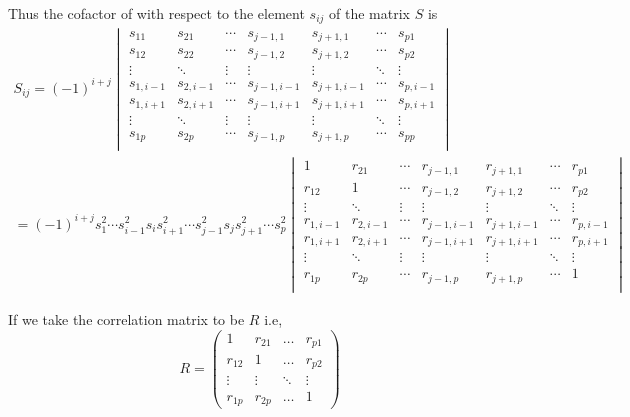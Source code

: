\documentclass[10pt]{article}
\begin{document}
Thus the cofactor of with respect to the element $ s_{ij} $ of the matrix $ S $ is 
\begin{gather}
	S_{ij} = (-1)^{i+j}
\begin{vmatrix}
	s_{11} & s_{21} & \cdots & s_{j-1,1} & s_{j+1, 1} & \cdots & s_{p1} \\
	s_{12} & s_{22} & \cdots & s_{j-1,2} & s_{j+1, 2} & \cdots & s_{p2} \\
	\vdots & \ddots & \vdots & \vdots & \vdots & \ddots & \vdots \\
	s_{1,i-1} & s_{2,i-1} & \cdots & s_{j-1,i-1} & s_{j+1,i-1} & \cdots & s_{p,i-1} \\
	s_{1,i+1} & s_{2,i+1} & \cdots & s_{j-1,i+1} & s_{j+1,i+1} & \cdots & s_{p,i+1} \\
	\vdots & \ddots & \vdots & \vdots & \vdots & \ddots & \vdots \\
	s_{1p} & s_{2p} & \cdots & s_{j-1,p} & s_{j+1, p} & \cdots & s_{pp} \\
\end{vmatrix} \nonumber \\
       = (-1)^{i+j} s_{1}^{2} \cdots s_{i-1}^{2}s_{i}s_{i+1}^{2} \cdots s_{j-1}^{2}s_{j}s_{j+1}^{2} \cdots s_{p}^{2}
\begin{vmatrix}
	1 & r_{21} & \cdots & r_{j-1,1} & r_{j+1, 1} & \cdots & r_{p1} \\
	r_{12} & 1 & \cdots & r_{j-1,2} & r_{j+1, 2} & \cdots & r_{p2} \\
	\vdots & \ddots & \vdots & \vdots & \vdots & \ddots & \vdots \\
	r_{1,i-1} & r_{2,i-1} & \cdots & r_{j-1, i-1} & r_{j+1,i-1} & \cdots & r_{p,i-1} \\
	r_{1,i+1} & r_{2,i+1} & \cdots & r_{j-1,i+1} & r_{j+1, i+1} & \cdots & r_{p,i+1} \\
	\vdots & \ddots & \vdots & \vdots & \vdots & \ddots & \vdots \\
	r_{1p} & r_{2p} & \cdots & r_{j-1,p} & r_{j+1, p} & \cdots & 1 \\
\end{vmatrix}
\end{gather}

If we take the correlation matrix to be $ R $ i.e,
\[ R = \begin{pmatrix}
	1 & r_{21} & \ldots & r_{p1} \\
	r_{12} & 1 & \ldots & r_{p2} \\
	\vdots & \vdots & \ddots & \vdots \\
	r_{1p} & r_{2p} & \ldots & 1
\end{pmatrix} \] 
\end{document}
